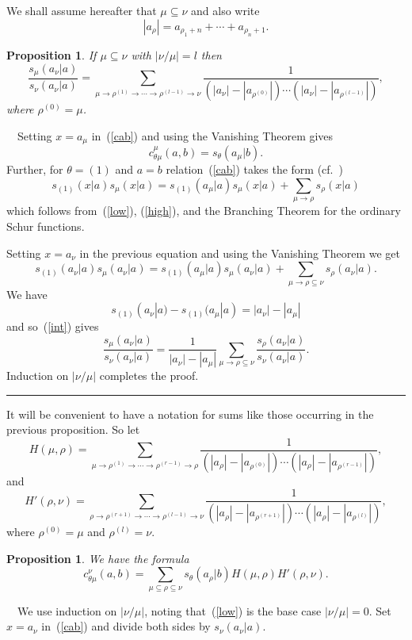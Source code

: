 \documentclass[titlepage,12pt]{article}
\newcommand{\bpr}{\begin{prop}}
\newcommand{\epr}{\end{prop}}
\newcommand{\beq}{\begin{equation}}
\newcommand{\eeq}{\end{equation}}
\newcommand{\Qed}{\rule{1ex}{1ex} \medskip}
\newcommand{\0}{{\bf 0}}
\newcommand{\1}{{\bf 1}}
\newcommand{\2}{{\bf 2}}
\newcommand{\3}{{\bf 3}}
\newcommand{\4}{{\bf 4}}
\newcommand{\5}{{\bf 5}}
\newcommand{\6}{{\bf 6}}
\newcommand{\7}{{\bf 7}}
\newcommand{\8}{{\bf 8}}
\newcommand{\9}{{\bf 9}}
\newcommand{\Proof}{\noindent{\bf Proof.}\ \ }
\newtheorem{prop}[thm]{Proposition}
\begin{document}
We shall assume hereafter that $\mu\subseteq\nu$ and also write
$$
|a_{\rho}|=a_{\rho_1+n}+\cdots+a_{\rho_n+1}.
$$


\bpr				\label{s/s}
If $\mu\subseteq\nu$ with $|\nu/\mu|=l$ then
$$
\frac{s_{\mu}(a_{\nu}|a)}{s_{\nu}(a_{\nu}|a)}
=\sum_{\mu\to\rho^{(1)}\to\cdots\to \rho^{(l-1)}\to\nu}
\frac{1}{(|a_{\nu}|-|a_{\rho^{(0)}}|)
\cdots (|a_{\nu}|-|a_{\rho^{(l-1)}}|)},
$$
where $\rho^{(0)}=\mu$.
\epr

\Proof Setting $x=a_{\mu}$ in~(\ref{cab}) and using the Vanishing Theorem
gives
\beq					\label{low}
c_{\theta\mu}^{\mu}(a,b)=s_{\theta}(a_{\mu}|b). 
\eeq
Further, for $\theta=(1)$ and $a=b$ relation~(\ref{cab}) takes the form
(cf.~\cite[Theorem 9.1]{oo:ssf})
$$
s_{(1)}(x|a)s_{\mu}(x|a)=s_{(1)}(a_{\mu}|a)
s_{\mu}(x|a)+\sum_{\mu\to\rho}s_{\rho}(x|a)
$$
which follows from~(\ref{low}), (\ref{high}), and the Branching Theorem
for the ordinary Schur functions.

Setting $x=a_{\nu}$ in the previous equation and using the Vanishing
Theorem we get 
\beq					\label{int}
s_{(1)}(a_{\nu}|a)s_{\mu}(a_{\nu}|a)=s_{(1)}(a_{\mu}|a)
s_{\mu}(a_{\nu}|a)+\sum_{\mu\to\rho\subseteq\nu}s_{\rho}(a_{\nu}|a). 
\eeq
We have
$$ 
s_{(1)}(a_{\nu}|a)-s_{(1)}(a_{\mu}|a)=
|a_{\nu}|-|a_{\mu}|
$$
and so~(\ref{int}) gives
$$
\frac{s_{\mu}(a_{\nu}|a)}{s_{\nu}(a_{\nu}|a)}=\frac{1}{|a_{\nu}|-|a_{\mu}|}
\sum_{\mu\to\rho\subseteq\nu}\frac{s_{\rho}(a_{\nu}|a)}{s_{\nu}(a_{\nu}|a)}.
$$
Induction on $|\nu/\mu|$ completes the proof.\hfill\Qed

It will be convenient to have a notation for sums like those
occurring in the previous proposition.  So let
\beq					\label{H}
H(\mu,\rho)=
\sum_{\mu\to\rho^{(1)}\to\cdots\to \rho^{(r-1)}\to\rho}
\frac{1}{(|a_{\rho}|-|a_{\rho^{(0)}}|)
\cdots (|a_{\rho}|-|a_{\rho^{(r-1)}}|)}, 
\eeq
and
\beq					\label{H'}
H'(\rho,\nu)=
\sum_{\rho\to\rho^{(r+1)}\to\cdots\to \rho^{(l-1)}\to\nu}
\frac{1}{(|a_{\rho}|-|a_{\rho^{(r+1)}}|)
\cdots (|a_{\rho}|-|a_{\rho^{(l)}}|)},
\eeq
where $\rho^{(0)}=\mu$ and $\rho^{(l)}=\nu$.

\bpr					\label{HH'}
We have the formula
$$
c_{\theta\mu}^{\nu}(a,b)=\sum_{\mu\subseteq\rho\subseteq\nu}
s_{\theta}(a_{\rho}|b) H(\mu,\rho) H'(\rho,\nu).
$$
\epr

\Proof We use induction on $|\nu/\mu|$, noting that~(\ref{low}) is the
base case $|\nu/\mu|=0$.
Set $x=a_{\nu}$ in~(\ref{cab}) and divide both sides by
$s_{\nu}(a_{\nu}|a)$.
\end{document}
